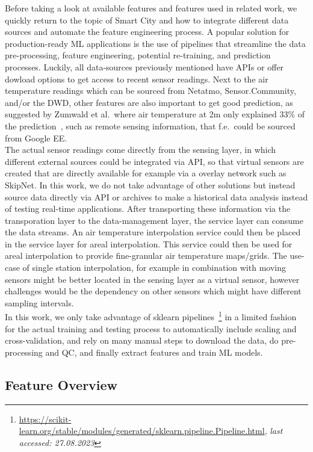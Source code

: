 Before taking a look at available features and features used in related work, we quickly return to the topic of Smart City and how to integrate different data sources and automate the feature engineering process. A popular solution for production-ready ML applications is the use of pipelines that streamline the data pre-processing, feature engineering, potential re-training, and prediction processes. Luckily, all data-sources previously mentioned have APIs or offer dowload options to get access to recent sensor readings. Next to the air temperature readings which can be sourced from Netatmo, Sensor.Community, and/or the DWD, other features are also important to get good prediction, as suggested by Zumwald et al.\ where air temperature at 2m only explained 33\% of the prediction~\cite{zumwald2021mapping}, such as remote sensing information, that f.e.\ could be sourced from Google EE.\\
The actual sensor readings come directly from the sensing layer, in which different external sources could be integrated via API, so that virtual sensors are created that are directly available for example via a overlay network such as SkipNet. In this work, we do not take advantage of other solutions but instead source data directly via API or archives to make a historical data analysis instead of testing real-time applications. After transporting these information via the transporation layer to the data-management layer, the service layer can consume the data streams. An air temperature interpolation service could then be placed in the service layer for areal interpolation. This service could then be used for areal interpolation to provide fine-granular air temperature maps/grids. The use-case of single station interpolation, for example in combination with moving sensors might be better located in the sensing layer as a virtual sensor, however challenges would be the dependency on other sensors which might have different sampling intervals.\\
In this work, we only take advantage of sklearn pipelines~\footnote{\url{https://scikit-learn.org/stable/modules/generated/sklearn.pipeline.Pipeline.html}, \textit{last accessed: 27.08.2023}} in a limited fashion for the actual training and testing process to automatically include scaling and cross-validation, and rely on many manual steps to download the data, do pre-processing and QC, and finally extract features and train ML models.

\subsection{Feature Overview}

